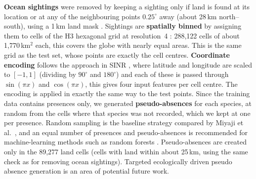 \documentclass{article}
\begin{document}
\textbf{Ocean sightings} were removed by keeping a sighting only if land is found at its location or at any of the neighbouring points $0.25^\circ$ away (about 28\,km north--south), using a 1\,km land mask \cite{globallandmask}. Sightings are \textbf{spatially binned} by assigning them to cells of the H3 hexagonal grid at resolution~4 \cite{h3}: 288,122 cells of about 1,770\,km$^2$ each, this covers the globe with nearly equal areas. This is the same grid as the test set, whose points are exactly the cell centres. \textbf{Coordinate encoding} follows the approach in SINR \cite{cole2023sinr}, where latitude and longitude are scaled to $[-1, 1]$ (dividing by $90^\circ$ and $180^\circ$) and each of these is passed through $\sin(\pi x)$ and $\cos(\pi x)$, this gives four input features per cell centre. The encoding is applied in exactly the same way to the test points. Since the training data contains presences only, we generated \textbf{pseudo-absences} for each species, at random from the cells where that species was not recorded, which we kept at one per presence. Random sampling is the baseline strategy compared by Miyaji et al.\ \cite{11345587}, and an equal number of presences and pseudo-absences is recommended for machine-learning methods such as random forests \cite{barbetmassin2012}. Pseudo-absences are created only in the 89,277 land cells (cells with land within about 25\,km, using the same check as for removing ocean sightings). Targeted ecologically driven pseudo absence generation is an area of potential future work.
\end{document}
